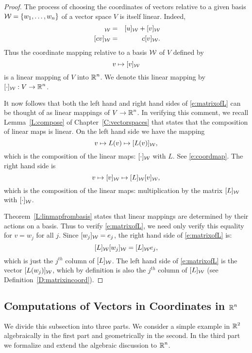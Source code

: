 \documentclass{ximera}
\begin{document}
\begin{proof} The process of choosing the coordinates of vectors relative to
a given basis ${\cal W} =\{w_1,\ldots,w_n\}$ of a vector space $V$
is itself linear.  Indeed,
\begin{eqnarray*}
[u+v]_{\cal W} & = & [u]_{\cal W} + [v]_{\cal W} \\
  \; [cv]_{\cal W}  & = &  c[v]_{\cal W}.
\end{eqnarray*}
Thus the coordinate mapping relative to a basis ${\cal W}$ of $V$
defined by
\begin{equation}  \label{e:coordmap}
v \mapsto [v]_{\cal W}
\end{equation}
is a linear mapping of $V$ into $\mbox{$\Bbb{R}$}^n$.  We denote this linear
mapping by $[\cdot]_{\cal W}:V\to\mbox{$\Bbb{R}$}^n$.


It now follows that both the left hand and right hand sides of
\eqref{e:matrixofL} can be thought of as linear mappings of $V\to\mbox{$\Bbb{R}$}^n$.
In verifying this comment, we recall Lemma~\ref{L:compose} of
Chapter~\ref{C:vectorspaces} that states that the composition of linear
maps is linear.  On the left hand side we have the mapping
\[
v \mapsto L(v) \mapsto [L(v)]_{\cal W},
\]
which is the composition of the linear maps: $[\cdot]_{\cal W}$ with
$L$.  See \eqref{e:coordmap}.  The right hand side is
\[
v \mapsto [v]_{\cal W} \mapsto [L]_{\cal W} [v]_{\cal W},
\]
which is the composition of the linear maps:  multiplication by the
matrix $[L]_{\cal W}$ with $[\cdot]_{\cal W}$.

Theorem~\ref{L:linmapfrombasis} 
states that linear mappings are determined by their actions on a
basis.  Thus to verify \eqref{e:matrixofL}, we need only verify this
equality for $v=w_j$ for all $j$.  Since $[w_j]_{\cal W}=e_j$, the right
hand side of \eqref{e:matrixofL} is:
\[
[L]_{\cal W} [w_j]_{\cal W} =  [L]_{\cal W} e_j,
\]
which is just the $j^{th}$ column of $[L]_{\cal W}$.  The left hand side of
\eqref{e:matrixofL} is the vector $[L(w_j)]_{\cal W}$, which by definition is
also the $j^{th}$ column of $[L]_{\cal W}$
(see Definition~\ref{D:matrixincoord}).    \end{proof}


\subsection*{Computations of Vectors in Coordinates in $\mbox{$\Bbb{R}$}^n$}

We divide this subsection into three parts.  We consider a simple example in
$\mbox{$\Bbb{R}$}^2$ algebraically in the first part and geometrically in the second.  In
the third part we formalize and extend the algebraic discussion to $\mbox{$\Bbb{R}$}^n$.
\end{document}
